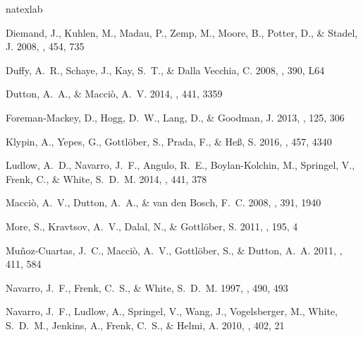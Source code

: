 \documentclass{emulateapj}
\begin{document}
\begin{thebibliography}{15}
\expandafter\ifx\csname natexlab\endcsname\relax\def\natexlab#1{#1}\fi

{Diemand}, J., {Kuhlen}, M., {Madau}, P., {Zemp}, M., {Moore}, B., {Potter},
  D., \& {Stadel}, J. 2008, \nat, 454, 735

{Duffy}, A.~R., {Schaye}, J., {Kay}, S.~T., \& {Dalla Vecchia}, C. 2008,
  \mnras, 390, L64

{Dutton}, A.~A., \& {Macci{\`o}}, A.~V. 2014, \mnras, 441, 3359

{Foreman-Mackey}, D., {Hogg}, D.~W., {Lang}, D., \& {Goodman}, J. 2013, \pasp,
  125, 306

{Klypin}, A., {Yepes}, G., {Gottl{\"o}ber}, S., {Prada}, F., \& {He{\ss}}, S.
  2016, \mnras, 457, 4340

{Ludlow}, A.~D., {Navarro}, J.~F., {Angulo}, R.~E., {Boylan-Kolchin}, M.,
  {Springel}, V., {Frenk}, C., \& {White}, S.~D.~M. 2014, \mnras, 441, 378

{Macci{\`o}}, A.~V., {Dutton}, A.~A., \& {van den Bosch}, F.~C. 2008, \mnras,
  391, 1940

{More}, S., {Kravtsov}, A.~V., {Dalal}, N., \& {Gottl{\"o}ber}, S. 2011, \apjs,
  195, 4

{Mu{\~n}oz-Cuartas}, J.~C., {Macci{\`o}}, A.~V., {Gottl{\"o}ber}, S., \&
  {Dutton}, A.~A. 2011, \mnras, 411, 584

{Navarro}, J.~F., {Frenk}, C.~S., \& {White}, S.~D.~M. 1997, \apj, 490, 493

{Navarro}, J.~F., {Ludlow}, A., {Springel}, V., {Wang}, J., {Vogelsberger}, M.,
  {White}, S.~D.~M., {Jenkins}, A., {Frenk}, C.~S., \& {Helmi}, A. 2010,
  \mnras, 402, 21


\end{thebibliography}
\end{document}

